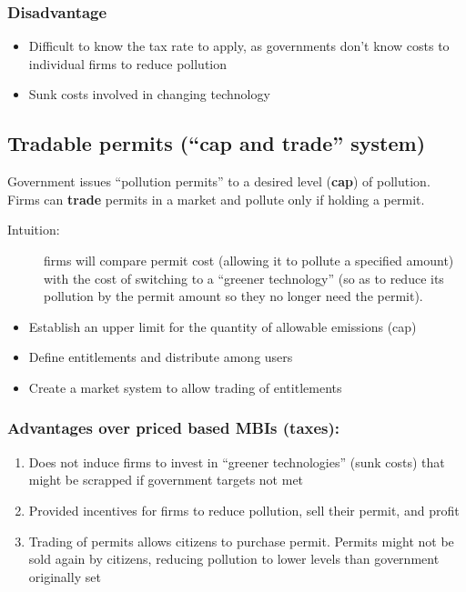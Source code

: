 \subsubsection{Disadvantage}
\begin{itemize}
	\item Difficult to know the tax rate to apply, as governments don't know costs to individual firms to reduce pollution
	\item Sunk costs involved in changing technology
\end{itemize}

\subsection{Tradable permits (``cap and trade'' system)}
Government issues ``pollution permits'' to a desired level (\textbf{cap}) of pollution. Firms can \textbf{trade} permits in a market and pollute only if holding a permit.
\begin{description}
	\item[Intuition:] firms will compare permit cost (allowing it to pollute a specified amount) with the cost of switching to a ``greener technology'' (so as to reduce its pollution by the permit amount so they no longer need the permit).
\end{description}
\begin{itemize}
	\item Establish an upper limit for the quantity of allowable emissions (cap)
	\item Define entitlements and distribute among users
	\item Create a market system to allow trading of entitlements
\end{itemize}
\subsubsection{Advantages over priced based MBIs (taxes):}
\begin{enumerate}
	\item Does not induce firms to invest in ``greener technologies'' (sunk costs) that might be scrapped if government targets not met
	\item Provided incentives for firms to reduce pollution, sell their permit, and profit
	\item Trading of permits allows citizens to purchase permit. Permits might not be sold again by citizens, reducing pollution to lower levels than government originally set
\end{enumerate}